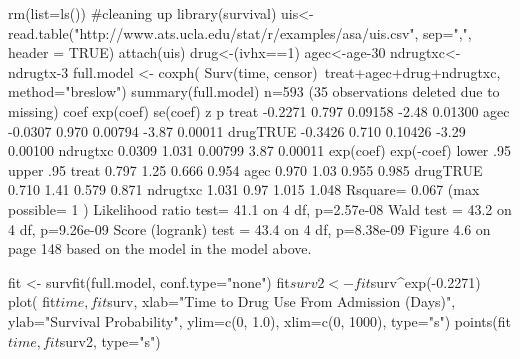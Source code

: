 rm(list=ls()) #cleaning up 
library(survival)
uis<-read.table("http://www.ats.ucla.edu/stat/r/examples/asa/uis.csv", sep=",", header = TRUE)
attach(uis)
drug<-(ivhx==1)
agec<-age-30
ndrugtxc<-ndrugtx-3
full.model <- coxph( Surv(time, censor)~treat+agec+drug+ndrugtxc, method="breslow")
summary(full.model)
  n=593 (35 observations deleted due to missing)
            coef exp(coef) se(coef)     z       p
treat    -0.2271     0.797  0.09158 -2.48 0.01300
agec     -0.0307     0.970  0.00794 -3.87 0.00011
drugTRUE -0.3426     0.710  0.10426 -3.29 0.00100
ndrugtxc  0.0309     1.031  0.00799  3.87 0.00011
         exp(coef) exp(-coef) lower .95 upper .95
treat        0.797       1.25     0.666     0.954
agec         0.970       1.03     0.955     0.985
drugTRUE     0.710       1.41     0.579     0.871
ndrugtxc     1.031       0.97     1.015     1.048
Rsquare= 0.067   (max possible= 1 )
Likelihood ratio test= 41.1  on 4 df,   p=2.57e-08
Wald test            = 43.2  on 4 df,   p=9.26e-09
Score (logrank) test = 43.4  on 4 df,   p=8.38e-09
Figure 4.6 on page 148 based on the model in the model above.

fit <- survfit(full.model, conf.type="none")
fit$surv2 <- fit$surv^exp(-0.2271)
plot( fit$time, fit$surv, xlab="Time to Drug Use From Admission (Days)", 
      ylab="Survival Probability", ylim=c(0, 1.0), xlim=c(0, 1000), type="s")
points(fit$time, fit$surv2,  type="s") 
